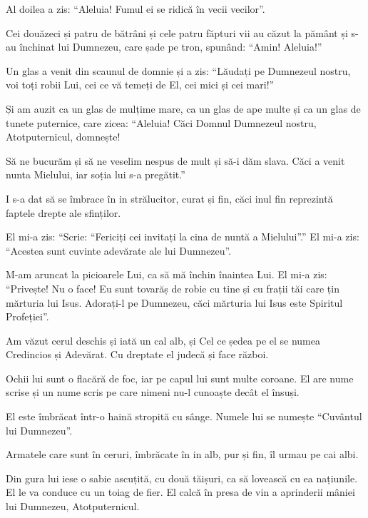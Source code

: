 {\par }{\PP {}Al doilea a zis: “Aleluia! Fumul ei se ridică în vecii vecilor”.

Cei douăzeci și patru de bătrâni și cele patru făpturi vii au căzut la pământ și s-au închinat lui Dumnezeu, care șade pe tron, spunând: “Amin! Aleluia!”


\par }{\PP {}Un glas a venit din scaunul de domnie și a zis: “Lăudați pe Dumnezeul nostru, voi toți robii Lui, cei ce vă temeți de El, cei mici și cei mari!”


\par }{\PP {}Și am auzit ca un glas de mulțime mare, ca un glas de ape multe și ca un glas de tunete puternice, care zicea: “Aleluia! Căci Domnul Dumnezeul nostru, Atotputernicul, domnește!

Să ne bucurăm și să ne veselim nespus de mult și să-i dăm slava. Căci a venit nunta Mielului, iar soția lui s-a pregătit.”

I s-a dat să se îmbrace în in strălucitor, curat și fin, căci inul fin reprezintă faptele drepte ale sfinților.


\par }{\PP {}El mi-a zis: “Scrie: “Fericiți cei invitați la cina de nuntă a Mielului”.” El mi-a zis: “Acestea sunt cuvinte adevărate ale lui Dumnezeu”.


\par }{\PP {}M-am aruncat la picioarele Lui, ca să mă închin înaintea Lui. El mi-a zis: “Privește! Nu o face! Eu sunt tovarăș de robie cu tine și cu frații tăi care țin mărturia lui Isus. Adorați-l pe Dumnezeu, căci mărturia lui Isus este Spiritul Profeției”.


\par }{\PP {}Am văzut cerul deschis și iată un cal alb, și Cel ce ședea pe el se numea Credincios și Adevărat. Cu dreptate el judecă și face război.

Ochii lui sunt o flacără de foc, iar pe capul lui sunt multe coroane. El are nume scrise și un nume scris pe care nimeni nu-l cunoaște decât el însuși.

El este îmbrăcat într-o haină stropită cu sânge. Numele lui se numește “Cuvântul lui Dumnezeu”.

Armatele care sunt în ceruri, îmbrăcate în in alb, pur și fin, îl urmau pe cai albi.

Din gura lui iese o sabie ascuțită, cu două tăișuri, ca să lovească cu ea națiunile. El le va conduce cu un toiag de fier. El calcă în presa de vin a aprinderii mâniei lui Dumnezeu, Atotputernicul.

}
